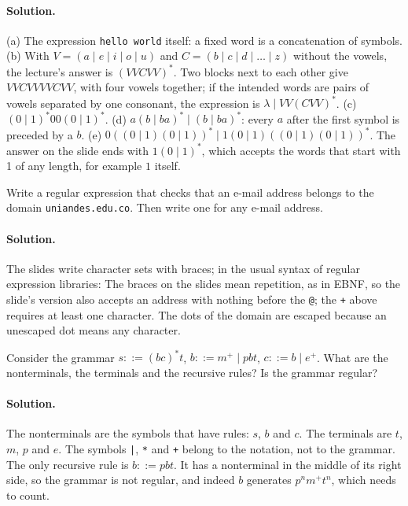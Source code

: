 \paragraph{Solution.}
(a) The expression \texttt{hello world} itself: a fixed word is a
concatenation of symbols.
(b) With $V = (a \mid e \mid i \mid o \mid u)$ and $C = (b \mid c \mid d \mid \dots \mid z)$
without the vowels, the lecture's answer is $(VVCVV)^*$. Two blocks next to
each other give $VVCVVVVCVV$, with four vowels together; if the intended
words are pairs of vowels separated by one consonant, the expression is
$\lambda \mid VV(CVV)^*$.
(c) $(0 \mid 1)^*00(0 \mid 1)^*$.
(d) $a(b \mid ba)^* \mid (b \mid ba)^*$: every $a$ after the first symbol is
preceded by a $b$.
(e) $0((0 \mid 1)(0 \mid 1))^* \mid 1(0 \mid 1)((0 \mid 1)(0 \mid 1))^*$. The answer on
the slide ends with $1(0 \mid 1)^*$, which accepts the words that start with
1 of any length, for example $1$ itself.

\begin{exercise}
Write a regular expression that checks that an e-mail address belongs to the
domain \texttt{uniandes.edu.co}. Then write one for any e-mail address.
\end{exercise}

\paragraph{Solution.} The slides write character sets with braces; in the
usual syntax of regular expression libraries:
The braces on the slides mean repetition, as in EBNF, so the slide's
version also accepts an address with nothing before the \texttt{@}; the
\texttt{+} above requires at least one character. The dots of the domain are
escaped because an unescaped dot means any character.

\begin{exercise}
Consider the grammar $s ::= (bc)^*t$, $b ::= m^+ \mid pbt$, $c ::= b \mid e^+$.
What are the nonterminals, the terminals and the recursive rules? Is the
grammar regular?
\end{exercise}

\paragraph{Solution.} The nonterminals are the symbols that have rules: $s$, $b$
and $c$. The terminals are $t$, $m$, $p$ and $e$. The symbols \texttt{|},
\texttt{*} and \texttt{+} belong to the notation, not to the grammar. The only
recursive rule is $b ::= pbt$. It has a nonterminal in the middle of its right
side, so the grammar is not regular, and indeed $b$ generates
$p^n m^+ t^n$, which needs to count.

